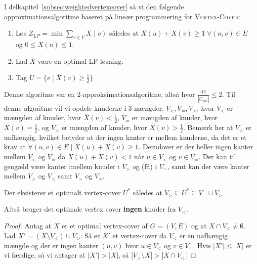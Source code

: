 I delkapitel~\ref{subsec:weightedvertexcover} så vi den følgende approximationsalgoritme baseret på lineær programmering for \textsc{Vertex-Cover}:
\begin{enumerate}
  \item Løs $Z_{LP} = \min \sum_{v \in V} X(v)$ således at $X(u)+X(v) \ge 1 \; \forall (u,v) \in E$ og $0 \le X(u) \le 1$.
  \item Lad $\overline{X}$ være en optimal LP-løsning.
  \item Tag $U = \{v \mid \overline{X}(v) \ge \frac{1}{2}\}$
\end{enumerate}

Denne algoritme var en $2$-approksimationsalgoritme, altså hvor $\frac{|U|}{|U_{\text{opt}}|} \le 2$. Til denne algoritme vil vi opdele knuderne i 3 mængder: $V_{<}, V_{=}, V_{>}$, hvor $V_{<}$ er mængden af knuder, hvor $\overline{X}(v) < \frac{1}{2}$, $V_{=}$ er mængden af knuder, hvor $\overline{X}(v) = \frac{1}{2}$, og $V_{>}$ er mængden af knuder, hvor $\overline{X}(v) > \frac{1}{2}$. Bemærk her at $V_{<}$ er uafhængig, hvilket betyder at der ingen kanter er mellem knuderne, da det er et krav at $\forall (u,v) \in E \mid X(u) + X(v) \ge 1$. Derudover er der heller ingen kanter mellem $V_{<}$ og $V_{=}$ da $X(u) + X(v) < 1$ når $u \in V_{<}$ og $v \in V_{=}$. Der kan til gengæld være kanter imellem knuder i $V_{>}$ og (få) i $V_{=}$, samt kan der være kanter mellem $V_{>}$ og $V_{<}$ samt $V_{>}$ og $V_{=}$.

\begin{theorem}
Der eksisterer et optimalt vertex-cover $U^{*}$ således at $V_{>} \subseteq U^{*} \subseteq V_{=} \cup V_{>}$
\end{theorem}

Altså bruger det optimale vertex cover \textbf{ingen} knuder fra $V_{<}$.

\begin{proof}
  Antag at $X$ er et optimal vertex-cover af $G = (V,E)$ og at $X \cap V_{<} \ne \emptyset$. Lad $X' = (X \setminus V_{<}) \cup V_{>}$. Så er $X'$ et vertex-cover da $V_{<}$ er en uafhængig mængde og der er ingen kanter $(u,v)$ hvor $u \in V_{<}$ og $v \in V_{=}$.
  Hvis $|X'| \le |X|$ er vi færdige, så vi antager at $|X'| > |X|$, så $|V_{>} \setminus X| > |X \cap V_{<}|$
\end{proof}

